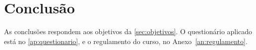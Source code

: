 \chapter{Conclusão}\label{cap:conclusao}

As conclusões respondem aos objetivos da \autoref{sec:objetivos}. O
questionário aplicado está no \autoref{ap:questionario}, e o regulamento do
curso, no Anexo~\ref{an:regulamento}.

